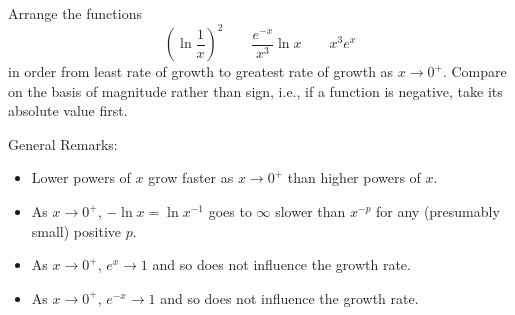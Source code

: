 \documentclass{ximera}
\begin{document}
\begin{question}%

Arrange the functions 
\[ \left( \ln \frac{1}{x} \right)^2 \qquad \frac{e^{- x}}{x^{3}} \ln{x} \qquad x^{3} e^{x} \]
in order from least rate of growth to greatest rate of growth as \(x \rightarrow 0^+\). Compare on the basis of magnitude rather than sign, i.e., if a function is negative, take its absolute value first.
\begin{multiplechoice}
\end{multiplechoice}
\begin{feedback}
General Remarks:
\begin{itemize} \item Lower powers of \(x\) grow faster as \(x \rightarrow 0^+\) than higher powers of \(x\).
\item As \(x \rightarrow 0^+\), \(-\ln x = \ln x^{-1}\) goes to \(\infty\) slower than \(x^{-p}\) for any (presumably small) positive \(p\).
\item As \(x \rightarrow 0^+\), \(e^{x} \rightarrow 1\) and so does not influence the growth rate.
\item As \(x \rightarrow 0^+\), \(e^{-x} \rightarrow 1\) and so does not influence the growth rate.
\end{itemize}
\end{feedback}

\end{question}
\end{document}
